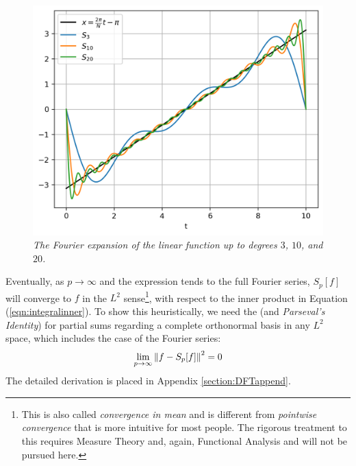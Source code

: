 \begin{figure}[t!]
    \centering
    \includegraphics[scale=0.7]{graphics/fourierxapprox.png}
    \caption{\textit{The Fourier expansion of the linear function up to degrees $3$, $10$, and $20$.}}
    \label{fig:fourierlint}
\end{figure}
Eventually, as $p \to \infty$ and the expression tends to the full Fourier series, $S_p[f]$ will converge to $f$ in the $L^2$ sense\footnote{This is also called \textit{convergence in mean} and is different from \textit{pointwise convergence} that is more intuitive for most people. The rigorous treatment to this requires Measure Theory and, again, Functional Analysis and will not be pursued here.}, with respect to the inner product in Equation (\ref{eqn:integralinner}). To show this heuristically, we need the  (and \textit{Parseval's Identity}) for partial sums regarding a complete orthonormal basis in any $L^2$ space, which includes the case of the Fourier series:
\begin{align}
\lim_{p \to \infty}\norm{f - S_p[f]}^2 = 0
\end{align}
The detailed derivation is placed in Appendix \ref{section:DFTappend}. \par
